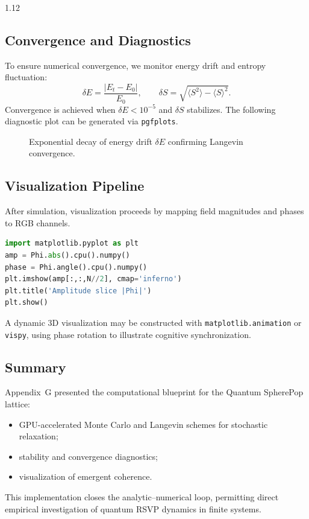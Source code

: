 \documentclass[12pt,a4paper]{article}
\numberwithin{equation}{section}
\theoremstyle{remark}
\theoremstyle{definition}
\begin{document}
\begin{spacing}{1.12}
\subsection{Convergence and Diagnostics}\label{sec:G-diagnostics}

To ensure numerical convergence, we monitor energy drift and entropy fluctuation:
\[
\delta E = \frac{|E_t - E_0|}{E_0}, \qquad
\delta S = \sqrt{\langle S^2\rangle - \langle S\rangle^2}.
\]
Convergence is achieved when $\delta E < 10^{-5}$ and $\delta S$ stabilizes.  
The following diagnostic plot can be generated via \texttt{pgfplots}.

\begin{figure}[h]
\centering
{}
\caption{Exponential decay of energy drift $\delta E$ confirming Langevin convergence.}
\label{fig:G-convergence}
\end{figure}

\subsection{Visualization Pipeline}\label{sec:G-visualization}
After simulation, visualization proceeds by mapping field magnitudes and phases to RGB channels.  

\begin{lstlisting}[language=Python,caption={Visualization of $\Phi$ magnitude and phase}]
import matplotlib.pyplot as plt
amp = Phi.abs().cpu().numpy()
phase = Phi.angle().cpu().numpy()
plt.imshow(amp[:,:,N//2], cmap='inferno')
plt.title('Amplitude slice |Phi|')
plt.show()
\end{lstlisting}

A dynamic 3D visualization may be constructed with \texttt{matplotlib.animation} or \texttt{vispy}, using phase rotation to illustrate cognitive synchronization.

\subsection{Summary}\label{sec:G-summary}
Appendix~G presented the computational blueprint for the Quantum SpherePop lattice:
\begin{itemize}
\item GPU-accelerated Monte Carlo and Langevin schemes for stochastic relaxation;
\item stability and convergence diagnostics;
\item visualization of emergent coherence.
\end{itemize}
This implementation closes the analytic–numerical loop, permitting direct empirical investigation of quantum RSVP dynamics in finite systems.


\end{spacing}
\end{document}
